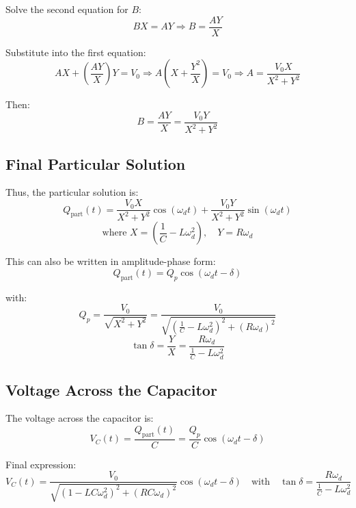 \documentclass{article}
\begin{document}
Solve the second equation for \( B \):
\[
B X = A Y \Rightarrow B = \frac{A Y}{X}
\]

Substitute into the first equation:
\[
A X + \left( \frac{A Y}{X} \right) Y = V_0
\Rightarrow A \left( X + \frac{Y^2}{X} \right) = V_0
\Rightarrow A = \frac{V_0 X}{X^2 + Y^2}
\]

Then:
\[
B = \frac{A Y}{X} = \frac{V_0 Y}{X^2 + Y^2}
\]

\subsection*{Final Particular Solution}

Thus, the particular solution is:
\[
Q_{\text{part}}(t) = \frac{V_0 X}{X^2 + Y^2} \cos(\omega_d t) + \frac{V_0 Y}{X^2 + Y^2} \sin(\omega_d t)
\]
\[
\text{where } X = \left( \frac{1}{C} - L \omega_d^2 \right), \quad Y = R \omega_d
\]

This can also be written in amplitude-phase form:
\[
Q_{\text{part}}(t) = Q_p \cos(\omega_d t - \delta)
\]

with:
\[
Q_p = \frac{V_0}{\sqrt{X^2 + Y^2}} = \frac{V_0}{\sqrt{\left( \frac{1}{C} - L \omega_d^2 \right)^2 + (R \omega_d)^2}}
\]
\[
\tan \delta = \frac{Y}{X} = \frac{R \omega_d}{\frac{1}{C} - L \omega_d^2}
\]

\subsection*{Voltage Across the Capacitor}

The voltage across the capacitor is:
\[
V_C(t) = \frac{Q_{\text{part}}(t)}{C} = \frac{Q_p}{C} \cos(\omega_d t - \delta)
\]

Final expression:
\[
\boxed{
V_C(t) = \frac{V_0}{\sqrt{(1 - L C \omega_d^2)^2 + (R C \omega_d)^2}} \cos(\omega_d t - \delta)
}
\quad \text{with} \quad
\tan \delta = \frac{R \omega_d}{\frac{1}{C} - L \omega_d^2}
\]
\end{document}
